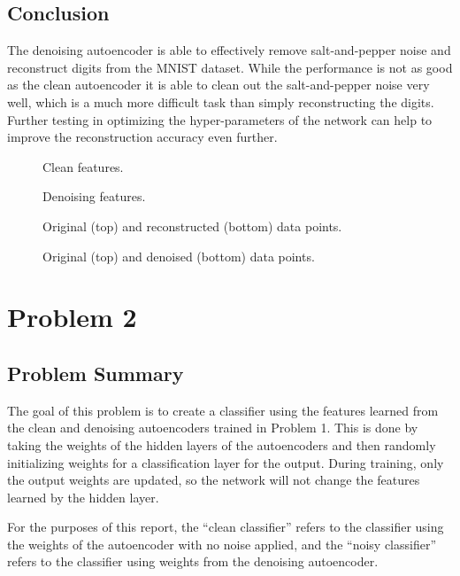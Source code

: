 \documentclass[a4paper, 12pt, titlepage]{article}
\begin{document}
  \subsection{Conclusion}
  \par The denoising autoencoder is able to effectively remove salt-and-pepper
  noise and reconstruct digits from the MNIST dataset.
  While the performance is not as good as the clean autoencoder it is able to
  clean out the salt-and-pepper noise very well, which is a much more difficult
  task than simply reconstructing the digits.
  Further testing in optimizing the hyper-parameters of the network can help to
  improve the reconstruction accuracy even further.

  \begin{figure}[p]
    \begin{minipage}{0.45\textwidth}
      \centering
      
      \caption{Clean features.}
      \label{fig:clean_feat}
    \end{minipage}
    \hfill
    \begin{minipage}{0.45\textwidth}
      \centering
      
      \caption{Denoising features.}
      \label{fig:noisy_feat}
    \end{minipage}
  \end{figure}
  \begin{figure}[p]
    \centering
    
    \caption{Original (top) and reconstructed (bottom) data points.}
    \label{fig:samples_clean}
  \end{figure}
  \begin{figure}[p]
    \centering
    
    \caption{Original (top) and denoised (bottom) data points.}
    \label{fig:samples_noisy}
  \end{figure}

  \pagebreak
  \section{Problem 2}
  \subsection{Problem Summary}
  \par The goal of this problem is to create a classifier using the features
  learned from the clean and denoising autoencoders trained in Problem 1.
  This is done by taking the weights of the hidden layers of the autoencoders
  and then randomly initializing weights for a classification layer for the
  output.
  During training, only the output weights are updated, so the network will
  not change the features learned by the hidden layer.
  \par For the purposes of this report, the ``clean classifier'' refers to the
  classifier using the weights of the autoencoder with no noise applied, and
  the ``noisy classifier'' refers to the classifier using weights from the
  denoising autoencoder.
\end{document}
